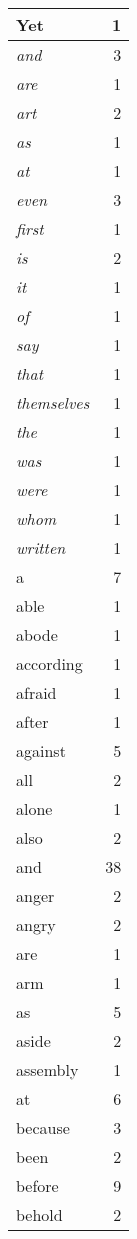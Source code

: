 \begin{center}
\begin{longtable}{l|r}
Yet & 1 \\ \hline
\emph{and} & 3 \\ \hline
\emph{are} & 1 \\ \hline
\emph{art} & 2 \\ \hline
\emph{as} & 1 \\ \hline
\emph{at} & 1 \\ \hline
\emph{even} & 3 \\ \hline
\emph{first} & 1 \\ \hline
\emph{is} & 2 \\ \hline
\emph{it} & 1 \\ \hline
\emph{of} & 1 \\ \hline
\emph{say} & 1 \\ \hline
\emph{that} & 1 \\ \hline
\emph{themselves} & 1 \\ \hline
\emph{the} & 1 \\ \hline
\emph{was} & 1 \\ \hline
\emph{were} & 1 \\ \hline
\emph{whom} & 1 \\ \hline
\emph{written} & 1 \\ \hline
a & 7 \\ \hline
able & 1 \\ \hline
abode & 1 \\ \hline
according & 1 \\ \hline
afraid & 1 \\ \hline
after & 1 \\ \hline
against & 5 \\ \hline
all & 2 \\ \hline
alone & 1 \\ \hline
also & 2 \\ \hline
and & 38 \\ \hline
anger & 2 \\ \hline
angry & 2 \\ \hline
are & 1 \\ \hline
arm & 1 \\ \hline
as & 5 \\ \hline
aside & 2 \\ \hline
assembly & 1 \\ \hline
at & 6 \\ \hline
because & 3 \\ \hline
been & 2 \\ \hline
before & 9 \\ \hline
behold & 2 \\ \hline

\end{longtable}
\end{center}
